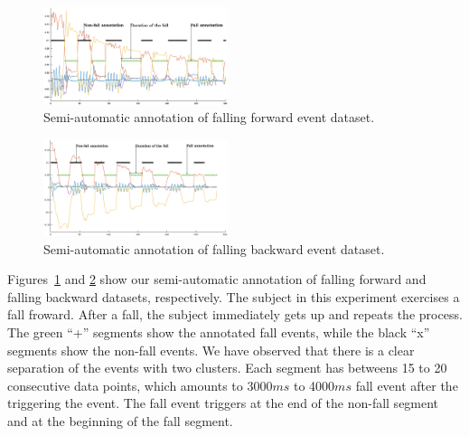 \documentclass{IEEEtran}
\begin{document}
\begin{figure}[!htb]
\centering
\includegraphics[width=0.48\textwidth]{plots/human_falling_forward2.eps} 
\caption{Semi-automatic annotation of falling forward event dataset.}
 \label{fig:automatic_annotation} 
\end{figure}


\begin{figure}[!htb]
\centering
\includegraphics[width=0.48\textwidth]{plots/human_falling_backward2.eps} 
\caption{Semi-automatic annotation of falling backward event dataset.}
 \label{fig:automatic_annotation2} 
\end{figure}







Figures~\ref{fig:automatic_annotation} and \ref{fig:automatic_annotation2} show our semi-automatic annotation of falling 
forward  and falling backward datasets, respectively. The subject in this experiment exercises a fall froward. After a 
fall, the subject immediately gets up and repeats the process. The green ``+'' segments 
show the annotated fall events, while the black ``x'' segments show the non-fall 
events. We have observed that there is a clear separation of the events with two 
clusters. Each segment has betweens 15 to 20 consecutive data points, which amounts to 
3000$ms$ to 4000$ms$ fall event after the triggering the event. The fall event triggers 
at the end of the non-fall segment and at the beginning of the fall segment.
\end{document}
